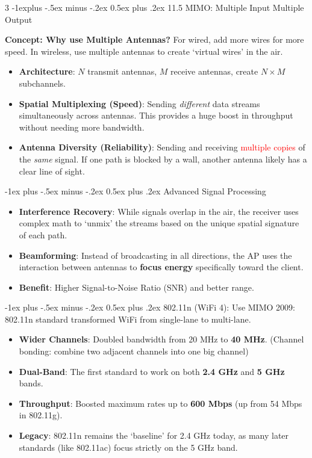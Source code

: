 \documentclass[a4paper, 9pt, landscape]{extarticle}
\makeatletter
\renewcommand{\subsection}{\@startsection{subsection}{2}{0mm}%
                                {-1explus -.5ex minus -.2ex}%
                                {0.5ex plus .2ex}%
                                {\normalfont\normalsize\bfseries}}
\renewcommand{\subsubsection}{\@startsection{paragraph}{4}{0mm}%
                                {-1ex plus -.5ex minus -.2ex}%
                                {0.5ex plus .2ex}%
                                {\normalfont\footnotesize\bfseries}}
\makeatother
\begin{document}
\begin{multicols*}{3}
\subsection{11.5 MIMO: Multiple Input Multiple Output}

\textbf{Concept: Why use Multiple Antennas?} For wired, add more wires for more speed. In wireless, use multiple antennas to create `virtual wires' in the air.

\begin{itemize}
  \item \textbf{Architecture}: $N$ transmit antennas, $M$ receive antennas, create $N \times M$ subchannels.
  \item \textbf{Spatial Multiplexing (Speed)}: Sending \textit{different} data streams simultaneously across antennas. This provides a huge boost in throughput without needing more bandwidth.
  \item \textbf{Antenna Diversity (Reliability)}: Sending and receiving \textcolor{red}{multiple copies} of the \textit{same} signal. If one path is blocked by a wall, another antenna likely has a clear line of sight.
\end{itemize}

\subsubsection{Advanced Signal Processing}
\begin{itemize}
  \item \textbf{Interference Recovery}: While signals overlap in the air, the receiver uses complex math to `unmix' the streams based on the unique spatial signature of each path.
  \item \textbf{Beamforming}: Instead of broadcasting in all directions, the AP uses the interaction between antennas to \textbf{focus energy} specifically toward the client.
  \item \textbf{Benefit}: Higher Signal-to-Noise Ratio (SNR) and better range.
\end{itemize}



\subsubsection{802.11n (WiFi 4): Use MIMO}
2009: 802.11n standard transformed WiFi from single-lane to multi-lane.

\begin{itemize}
  \item \textbf{Wider Channels}: Doubled bandwidth from 20 MHz to \textbf{40 MHz}. (Channel bonding: combine two adjacent channels into one big channel)
  \item \textbf{Dual-Band}: The first standard to work on both \textbf{2.4 GHz} and \textbf{5 GHz} bands.
  \item \textbf{Throughput}: Boosted maximum rates up to \textbf{600 Mbps} (up from 54 Mbps in 802.11g).
  \item \textbf{Legacy}: 802.11n remains the `baseline' for 2.4 GHz today, as many later standards (like 802.11ac) focus strictly on the 5 GHz band.
\end{itemize}


\end{multicols*}
\end{document}
